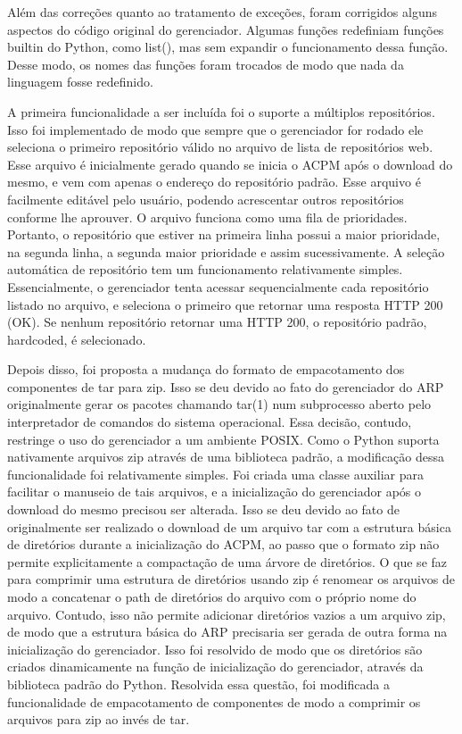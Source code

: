 \documentclass[12pt]{article}
\begin{document}
Além das correções quanto ao tratamento de exceções, foram corrigidos alguns
aspectos do código original do gerenciador. Algumas funções redefiniam funções
builtin do Python, como list(), mas sem expandir o funcionamento dessa função.
Desse modo, os nomes das funções foram trocados de modo que nada da linguagem
fosse redefinido.

A primeira funcionalidade a ser incluída foi o suporte a múltiplos repositórios.
Isso foi implementado de modo que sempre que o gerenciador for rodado ele
seleciona o primeiro repositório válido no arquivo de lista de repositórios web.
Esse arquivo é inicialmente gerado quando se inicia o ACPM após o download do
mesmo, e vem com apenas o endereço do repositório padrão. Esse arquivo é
facilmente editável pelo usuário, podendo acrescentar outros repositórios
conforme lhe aprouver. O arquivo funciona como uma fila de prioridades.
Portanto, o repositório que estiver na primeira linha possui a maior prioridade,
na segunda linha, a segunda maior prioridade e assim sucessivamente. A seleção
automática de repositório tem um funcionamento relativamente simples.
Essencialmente, o gerenciador tenta acessar sequencialmente cada repositório
listado no arquivo, e seleciona o primeiro que retornar uma resposta HTTP 200
(OK). Se nenhum repositório retornar uma HTTP 200, o repositório padrão,
hardcoded, é selecionado.

Depois disso, foi proposta a mudança do formato de empacotamento dos componentes
de tar para zip. Isso se deu devido ao fato do gerenciador do ARP originalmente
gerar os pacotes chamando tar(1) num subprocesso aberto pelo interpretador de
comandos do sistema operacional. Essa decisão, contudo, restringe o uso do
gerenciador a um ambiente POSIX. Como o Python suporta nativamente arquivos zip
através de uma biblioteca padrão, a modificação dessa funcionalidade foi
relativamente simples. Foi criada uma classe auxiliar para facilitar o manuseio
de tais arquivos, e a inicialização do gerenciador após o download do mesmo
precisou ser alterada. Isso se deu devido ao fato de originalmente ser realizado
o download de um arquivo tar com a estrutura básica de diretórios durante a
inicialização do ACPM, ao passo que o formato zip não permite explicitamente a
compactação de uma árvore de diretórios. O que se faz para comprimir uma
estrutura de diretórios usando zip é renomear os arquivos de modo a concatenar o
path de diretórios do arquivo com o próprio nome do arquivo. Contudo, isso não
permite adicionar diretórios vazios a um arquivo zip, de modo que a estrutura
básica do ARP precisaria ser gerada de outra forma na inicialização do
gerenciador. Isso foi resolvido de modo que os diretórios são criados
dinamicamente na função de inicialização do gerenciador, através da biblioteca
padrão do Python. Resolvida essa questão, foi modificada a funcionalidade de
empacotamento de componentes de modo a comprimir os arquivos para zip ao invés
de tar.
\end{document}
